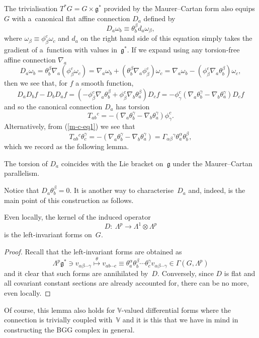 \documentclass[pdftex]{sigma}
\begin{document}
The trivialisation $T^*G=G\times{\mathfrak{g}}^*$ provided by the Maurer--Cartan
form also equips $G$ with a~canonical f\/lat af\/f\/ine connection $D_a$ def\/ined
by
\[D_a\omega_b\equiv\theta_b^\beta d_a\omega_\beta,\]
where $\omega_\beta\equiv\phi_\beta^c\omega_c$ and
$d_a$ on the right hand side of this equation simply takes the
gradient of a~function with values in~${\mathfrak{g}}^*$. If we expand using
any torsion-free af\/f\/ine connection $\nabla_a$
\[D_a\omega_b=\theta_b^\beta \nabla_a(\phi_\beta^c\omega_c)
=\nabla_a\omega_b+(\theta_b^\beta \nabla_a\phi_\beta^c)\omega_c
=\nabla_a\omega_b-(\phi_\beta^c\nabla_a\theta_b^\beta)\omega_c,\]
then we see that, for $f$ a smooth function,
\[D_aD_bf-D_bD_af
=(-\phi_\beta^c \nabla_a\theta_b^\beta+\phi_\beta^c \nabla_b\theta_a^\beta)D_cf
=-\phi_\gamma^c(\nabla_a\theta_b^\gamma-\nabla_b\theta_a^\gamma)D_cf\]
and so the canonical connection $D_a$ has torsion
\[T_{ab}{}^c=-(\nabla_a\theta_b^\gamma-\nabla_b\theta_a^\gamma)\phi_\gamma^c.\]
Alternatively, from (\ref{m-c-eq1}) we see that
\[T_{ab}{}^c\theta_c^\gamma=-(\nabla_a\theta_b^\gamma-\nabla_b\theta_a^\gamma)
=\Gamma_{\alpha\beta}{}^\gamma\theta_a^\alpha\theta_b^\beta,\]
which we record as the following lemma.
\begin{lemma}\label{torsion_is_bracket}
The torsion of\/ $D_a$ coincides with
the Lie bracket on\/~${\mathfrak{g}}$ under the Maurer--Cartan parallelism.
\end{lemma}
Notice that $D_a\theta_b^\beta=0$. It is another way to
characterise~$D_a$ and, indeed, is the main point of this construction as
follows.
\begin{lemma} Even locally, the kernel of the induced operator
\[D: \ \Lambda^p\to\Lambda^1\otimes\Lambda^p\]
is the left-invariant forms on~$G$.
\end{lemma}
\begin{proof}
Recall that the left-invariant forms are obtained as
\[\Lambda^p{\mathfrak{g}}^*\ni v_{\alpha\beta\cdots\gamma}
\stackrel{\theta}{\longmapsto}v_{ab\cdots c}\equiv
\theta_a^\alpha\theta_b^\beta\cdots\theta_c^\gamma
v_{\alpha\beta\cdots\gamma}\in\Gamma(G,\Lambda^p)\]
and it clear that such forms are annihilated by~$D$. Conversely, since $D$ is
f\/lat and all covariant constant sections are already accounted for, there can
be no more, even locally.
\end{proof}
\begin{remark} Of course, this lemma also holds for ${\mathbb{V}}$-valued
dif\/ferential forms where the connection is trivially coupled
with~${\mathbb{V}}$ and it is this that we have in mind in constructing
the BGG complex in general.
\end{remark}
\end{document}
